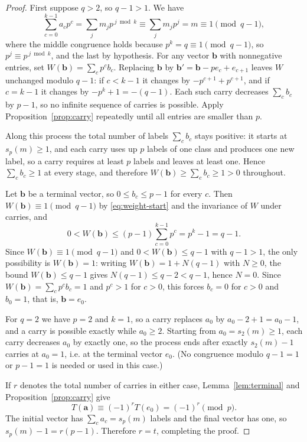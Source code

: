 \documentclass[11pt]{amsart}
\theoremstyle{definition}
\theoremstyle{remark}
\begin{document}
\begin{proof}
First suppose $q>2$, so $q-1>1$.  We have
\begin{equation}\label{eq:weight-start}
 \sum_{c=0}^{k-1}a_cp^c
 =\sum_jm_jp^{\,j\bmod k}
 \equiv\sum_jm_jp^j=m\equiv1\pmod{q-1},
\end{equation}
where the middle congruence holds because $p^k=q\equiv1\pmod{q-1}$, so $p^j\equiv p^{\,j\bmod k}$, and the last by hypothesis.
For any vector $\mathbf b$ with nonnegative entries, set $W(\mathbf b)=\sum_cp^cb_c$.  Replacing $\mathbf b$ by $\mathbf b'=\mathbf b-pe_c+e_{c+1}$ leaves $W$ unchanged modulo $q-1$: if $c<k-1$ it changes by $-p^{c+1}+p^{c+1}$, and if $c=k-1$ it changes by $-p^k+1=-(q-1)$.  Each such carry decreases $\sum_cb_c$ by $p-1$, so no infinite sequence of carries is possible.  Apply Proposition~\ref{prop:carry} repeatedly until all entries are smaller than $p$.

Along this process the total number of labels $\sum_cb_c$ stays positive: it starts at $s_p(m)\ge1$, and each carry uses up $p$ labels of one class and produces one new label, so a carry requires at least $p$ labels and leaves at least one.  Hence $\sum_cb_c\ge1$ at every stage, and therefore $W(\mathbf b)\ge\sum_cb_c\ge1>0$ throughout.

Let $\mathbf b$ be a terminal vector, so $0\le b_c\le p-1$ for every $c$.  Then $W(\mathbf b)\equiv1\pmod{q-1}$ by \eqref{eq:weight-start} and the invariance of $W$ under carries, and
\[
 0<W(\mathbf b)\le(p-1)\sum_{c=0}^{k-1}p^c=p^k-1=q-1.
\]
Since $W(\mathbf b)\equiv1\pmod{q-1}$ and $0<W(\mathbf b)\le q-1$ with $q-1>1$, the only possibility is $W(\mathbf b)=1$: writing $W(\mathbf b)=1+N(q-1)$ with $N\ge0$, the bound $W(\mathbf b)\le q-1$ gives $N(q-1)\le q-2<q-1$, hence $N=0$.  Since $W(\mathbf b)=\sum_cp^cb_c=1$ and $p^c>1$ for $c>0$, this forces $b_c=0$ for $c>0$ and $b_0=1$, that is, $\mathbf b=e_0$.

For $q=2$ we have $p=2$ and $k=1$, so a carry replaces $a_0$ by $a_0-2+1=a_0-1$, and a carry is possible exactly while $a_0\ge2$.  Starting from $a_0=s_2(m)\ge1$, each carry decreases $a_0$ by exactly one, so the process ends after exactly $s_2(m)-1$ carries at $a_0=1$, i.e. at the terminal vector $e_0$.  (No congruence modulo $q-1=1$ or $p-1=1$ is needed or used in this case.)

If $r$ denotes the total number of carries in either case, Lemma~\ref{lem:terminal} and Proposition~\ref{prop:carry} give
\[
 T(\mathbf a)\equiv(-1)^rT(e_0)=(-1)^r\pmod p.
\]
The initial vector has $\sum_ca_c=s_p(m)$ labels and the final vector has one, so $s_p(m)-1=r(p-1)$.  Therefore $r=t$, completing the proof.
\end{proof}
\end{document}
